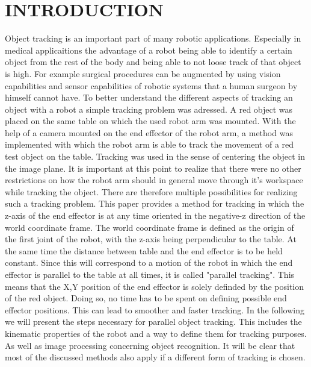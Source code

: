 \documentclass[letterpaper, 10 pt, conference]{IEEEconf}  %
\begin{document}
\section{INTRODUCTION}
Object tracking is an important part of many robotic applications. Especially in medical applicaitions the advantage of a robot being able to identify a certain object from the rest of the body and being able to not loose track of that object is high. For example surgical procedures can be augmented by using vision capabilities and sensor capabilities of robotic systems that a human surgeon by himself cannot have. To better understand the different aspects of tracking an object with a robot a simple tracking problem was adressed. A red object was placed on the same table on which the used robot arm was mounted. With the help of a camera mounted on the end effector of the robot arm, a method was implemented with which the robot arm is able to track the movement of a red test object on the table. Tracking was used in the sense of centering the object in the image plane. It is important at this point to realize that there were no other restrictions on how the robot arm should in general move through it's workspace while tracking the object. There are therefore multiple possibilities for realizing such a tracking problem. This paper provides a method for tracking in which the z-axis of the end effector is at any time oriented in the negative-z direction of the world coordinate frame. The world coordinate frame is defined as the origin of the first joint of the robot, with the z-axis being perpendicular to the table. At the same time the distance between table and the end effector is to be held constant. Since this will correspond to a motion of the robot in which the end effector is parallel to the table at all times, it is called "parallel tracking". This means that the X,Y position of the end effector is solely definded by the position of the red object. Doing so, no time has to be spent on defining possible end effector positions. This can lead to smoother and faster tracking. In the following we will present the steps necessary for parallel object tracking. This includes the kinematic properties of the robot and a way to define them for tracking purposes. As well as image processing concerning object recognition. It will be clear that most of the discussed methods also apply if a different form of tracking is chosen.

\end{document}
